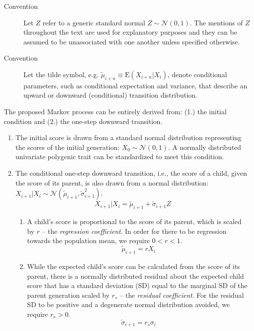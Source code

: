 \documentclass[a4paper,11pt]{article} %
\begin{document}
\begin{description}
\item [Convention] Let $Z$ refer to a generic standard normal $Z \sim \mathcal{N}(0, 1)$. The mentions of $Z$ throughout the text are used for explanatory purposes and they can be assumed to be unassociated with one another unless specified otherwise.
\item [Convention] Let the tilde symbol, e.g. $\tilde{\mu}_{i+n} \equiv \mathrm{E}(X_{i+n}|X_i)$, denote conditional parameters, such as conditional expectation and variance, that describe an upward or downward (conditional) transition distribution.
\end{description}

The proposed Markov process can be entirely derived from: (1.) the initial condition and (2.) the one-step downward transition. 

\begin{enumerate}
\item The initial score is drawn from a standard normal distribution representing the scores of the initial generation: $X_0 \sim \mathcal{N}(0, 1)$. A normally distributed univariate polygenic trait can be standardized to meet this condition. 

\item The conditional one-step downward transition, i.e., the score of a child, given the score of its parent, is also drawn from a normal distribution: $X_{i+1}|X_i \sim \mathcal{N}(\tilde{\mu}_{i+1}, \tilde{\sigma}_{i+1}^2)$.
$$X_{i+1}|X_i = \tilde{\mu}_{i+1} + \tilde{\sigma}_{i+1} Z$$ 

\begin{enumerate}
\item A child's score is proportional to the score of its parent, which is scaled by $r$ -- the \emph{regression coefficient}. In order for there to be regression towards the population mean, we require $0 < r < 1$. 
$$\tilde{\mu}_{i+1} = rX_i$$

\item While the expected child's score can be calculated from the score of its parent, there is a normally distributed residual about the expected child score that has a standard deviation (SD) equal to the marginal SD of the parent generation scaled by $r_s$ -- the \emph{residual coefficient}. For the residual SD to be positive and a degenerate normal distribution avoided, we require $r_s > 0$.
$$\tilde{\sigma}_{i+1} = r_s \sigma_i$$
\end{enumerate}
\end{enumerate}
\end{document}
